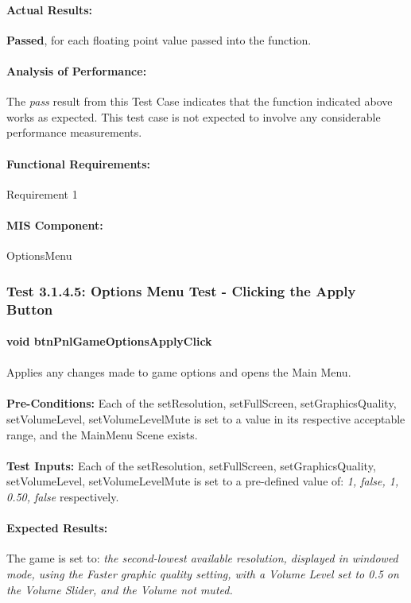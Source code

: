 \documentclass{article}
\begin{document}
    \paragraph{Actual Results:} \textbf{Passed}, for each floating point value passed into the function.
    \paragraph{Analysis of Performance:} The \emph{pass} result from this Test Case indicates that the function indicated above works as expected. This test case is not expected to involve any considerable performance measurements.
    \paragraph{Functional Requirements:} Requirement 1
    \paragraph{MIS Component:} OptionsMenu
    
     \subsubsection{Test 3.1.4.5: Options Menu Test - Clicking the Apply Button}
    \paragraph{}\textbf{void btnPnlGameOptionsApplyClick}
    \paragraph{} Applies any changes made to game options and opens the Main Menu.
    \paragraph{}\textbf{Pre-Conditions:} Each of the setResolution, setFullScreen, setGraphicsQuality, setVolumeLevel, setVolumeLevelMute is set to a value in its respective acceptable range, and the MainMenu Scene exists.
    \paragraph{}\textbf{Test Inputs:} Each of the  setResolution, setFullScreen, setGraphicsQuality, setVolumeLevel, setVolumeLevelMute is set to a pre-defined value of:  \emph{1, false, 1, 0.50, false} respectively.
    \paragraph{Expected Results:} The game is set to: \emph{the second-lowest available resolution, displayed in windowed mode, using the Faster graphic quality setting, with a Volume Level set to 0.5 on the Volume Slider, and the Volume not muted.}
\end{document}

